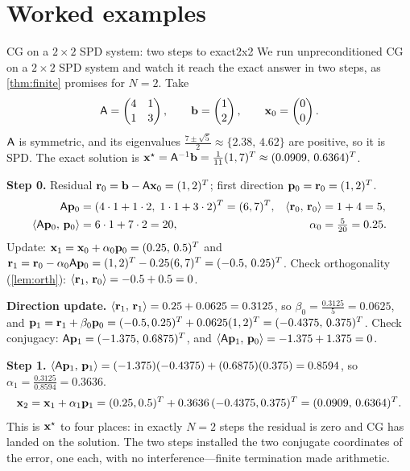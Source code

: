 \section{Worked examples}

\begin{workedexample}{CG on a $2\times2$ SPD system: two steps to exact}{2x2}
We run unpreconditioned CG on a $2\times2$ SPD system and watch it reach the exact
answer in two steps, as \cref{thm:finite} promises for $N=2$. Take
\[
  \mathsf{A}=\begin{pmatrix}4 & 1\\[1pt] 1 & 3\end{pmatrix},\qquad
  \mathbf{b}=\begin{pmatrix}1\\[1pt] 2\end{pmatrix},\qquad
  \mathbf{x}_0=\begin{pmatrix}0\\[1pt] 0\end{pmatrix}.
\]
$\mathsf{A}$ is symmetric, and its eigenvalues
$\tfrac{7\pm\sqrt5}{2}\approx\{2.38,\,4.62\}$ are positive, so it is SPD. The
exact solution is $\mathbf{x}^\star=\mathsf{A}^{-1}\mathbf{b}=\tfrac1{11}(1,7)^{T}
\approx(0.0909,\,0.6364)^{T}$.

\tcblower
\textbf{Step 0.} Residual $\mathbf{r}_0=\mathbf{b}-\mathsf{A}\mathbf{x}_0=(1,2)^{T}$; first direction
$\mathbf{p}_0=\mathbf{r}_0=(1,2)^{T}$.
\begin{align*}
  \mathsf{A}\mathbf{p}_0 &= (4\cdot1+1\cdot2,\;1\cdot1+3\cdot2)^{T}=(6,7)^{T}, &
  \left\langle \mathbf{r}_0,\, \mathbf{r}_0\right\rangle &= 1+4 = 5,\\
  \left\langle \mathsf{A}\mathbf{p}_0,\, \mathbf{p}_0\right\rangle &= 6\cdot1+7\cdot2 = 20, &
  \alpha_0 &= \tfrac{5}{20} = 0.25.
\end{align*}
Update: $\mathbf{x}_1=\mathbf{x}_0+\alpha_0\mathbf{p}_0=(0.25,\,0.5)^{T}$ and
$\mathbf{r}_1=\mathbf{r}_0-\alpha_0\mathsf{A}\mathbf{p}_0=(1,2)^{T}-0.25(6,7)^{T}=(-0.5,\,0.25)^{T}$.
Check orthogonality (\cref{lem:orth}): $\left\langle \mathbf{r}_1,\, \mathbf{r}_0\right\rangle=-0.5+0.5=0$.~\checkmark

\textbf{Direction update.}
$\left\langle \mathbf{r}_1,\, \mathbf{r}_1\right\rangle=0.25+0.0625=0.3125$, so
$\beta_0=\tfrac{0.3125}{5}=0.0625$, and
$\mathbf{p}_1=\mathbf{r}_1+\beta_0\mathbf{p}_0=(-0.5,0.25)^{T}+0.0625(1,2)^{T}=(-0.4375,\,0.375)^{T}$.
Check conjugacy: $\mathsf{A}\mathbf{p}_1=(-1.375,\,0.6875)^{T}$, and
$\left\langle \mathsf{A}\mathbf{p}_1,\, \mathbf{p}_0\right\rangle=-1.375+1.375=0$.~\checkmark

\textbf{Step 1.}
$\left\langle \mathsf{A}\mathbf{p}_1,\, \mathbf{p}_1\right\rangle=(-1.375)(-0.4375)+(0.6875)(0.375)=0.8594$, so
$\alpha_1=\tfrac{0.3125}{0.8594}=0.3636$.
\[
  \mathbf{x}_2 = \mathbf{x}_1+\alpha_1\mathbf{p}_1
        = (0.25,0.5)^{T}+0.3636\,(-0.4375,0.375)^{T}
        = (0.0909,\,0.6364)^{T}.
\]
This is $\mathbf{x}^\star$ to four places: in exactly $N=2$ steps the residual is zero
and CG has landed on the solution. The two steps installed the two conjugate
coordinates of the error, one each, with no interference---finite termination made
arithmetic.
\end{workedexample}

